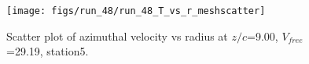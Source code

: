 \begin{figure}[H]
\centering
\texttt{[image: figs/run\_48/run\_48\_T\_vs\_r\_meshscatter]}
\caption{Scatter plot of azimuthal velocity vs radius at $z/c$=9.00, $V_{free}$=29.19, station5.}
\end{figure}


